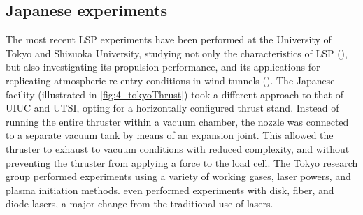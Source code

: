         \subsection{Japanese experiments}
            The most recent LSP experiments have been performed at the University of Tokyo and Shizuoka University, studying not only the characteristics of LSP (\textcite{inoueOscillationPhenomenonLasersustained2004}), but also investigating its propulsion performance, and its applications for replicating atmospheric re-entry conditions in wind tunnels (\textcite{matsuiAtomicOxygenFlowGenerationLaserDriven2014}). The Japanese facility (illustrated in \autoref{fig:4_tokyoThrust}) took a different approach to that of UIUC and UTSI, opting for a horizontally configured thrust stand. Instead of running the entire thruster within a vacuum chamber, the nozzle was connected to a separate vacuum tank by means of an expansion joint. This allowed the thruster to exhaust to vacuum conditions with reduced complexity, and without preventing the thruster from applying a force to the load cell. The Tokyo research group performed experiments using a variety of working gases, laser powers, and plasma initiation methods. \textcite{matsuiGeneratingConditionsArgon2019} even performed experiments with disk, fiber, and diode lasers, a major change from the traditional use of  lasers.

